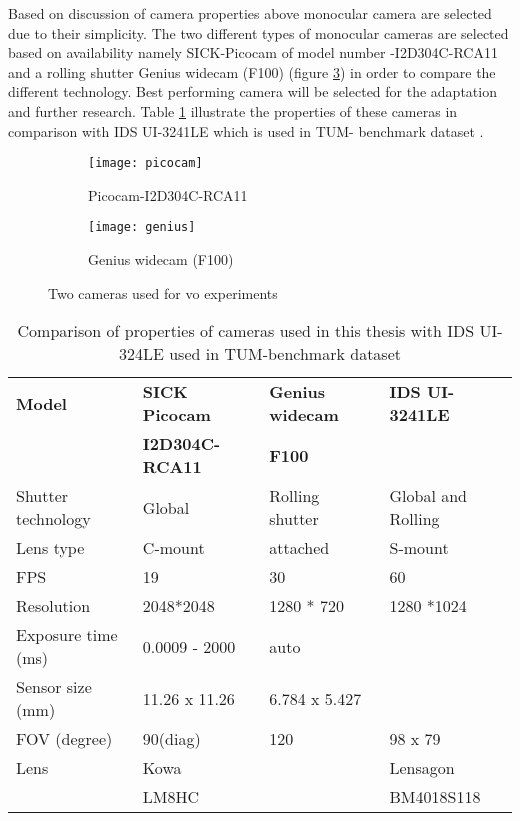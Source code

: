 \newline
Based on discussion of camera properties above monocular camera are selected due to their simplicity. The two different types of monocular cameras are selected based on availability namely SICK-Picocam of model number -I2D304C-RCA11 and a rolling shutter Genius widecam (F100)
(figure \ref{fig:cameras_used}) in order to compare the different technology. Best performing camera will be selected for the adaptation and further research. Table \ref{table:camera_prop} illustrate the properties of these cameras in comparison with IDS UI-3241LE which is used in TUM- benchmark dataset \cite{photometrically}.
\begin{figure}[h!]
	\begin{subfigure}{.5\textwidth}
		\centering
		\texttt{[image: picocam]}
		\caption{Picocam-I2D304C-RCA11 \cite{picocam}}
		\label{fig:picocam}
	\end{subfigure}%
	\begin{subfigure}{.5\textwidth}
		\centering
		\texttt{[image: genius]}
		\caption{ Genius widecam (F100) \cite{genius}}
		\label{fig:webcam}
	\end{subfigure}
	\caption{Two cameras used for \acrshort{vo} experiments}
	\label{fig:cameras_used}
\end{figure}

\begin{table}[h!]
	\centering
	\begin{tabular}{ | l | l | l | l |}
		\hline
		\textbf{Model} & \textbf{SICK Picocam}  & \textbf{Genius widecam}  & \textbf{IDS UI-3241LE}  \\  
		              & \textbf{I2D304C-RCA11} & \textbf{F100} &  \\  
		\hline
		Shutter technology & Global & Rolling shutter & Global and Rolling \\ 
		\hline
		Lens type         & C-mount & attached        & S-mount \\ 
		\hline
		FPS               & 19      & 30              & 60\\ 
		\hline
		Resolution       & 2048*2048  &  1280 * 720   & 1280 *1024 \\
		 \hline
		Exposure time (ms) & 0.0009 - 2000 & auto &    \\
		 \hline
		Sensor size (mm) & 11.26 x 11.26 & 6.784 x 5.427 &  \\
		 \hline
		FOV (degree) &  90(diag) &  120 & 98 x 79  \\
		 \hline
		Lens &  Kowa   &   & Lensagon \\
		     &  LM8HC  &   & BM4018S118  \\
		 \hline
	\end{tabular}
    \caption{Comparison of properties of cameras used in this thesis with IDS UI-324LE used in TUM-benchmark dataset}
    \label{table:camera_prop}
\end{table}
